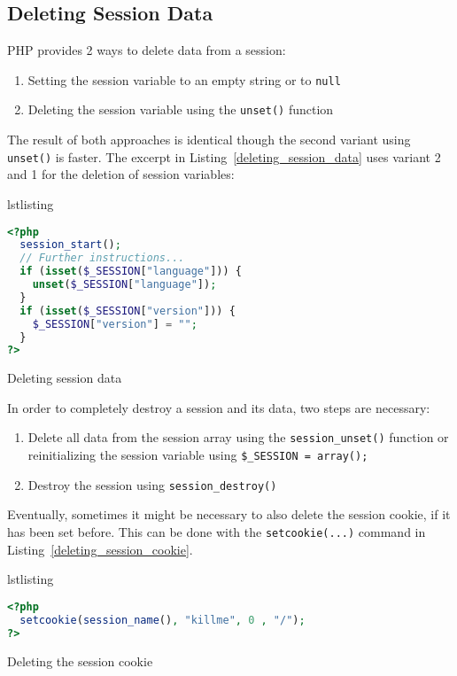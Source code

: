 \documentclass[a4paper, justified, notoc]{tufte-handout} %
\makeatletter
\newenvironment{listing}[1][htbp]
  {\ifvmode\else\unskip\fi\begin{@tufte@float}[#1]{lstlisting}{}}
  {\end{@tufte@float} } %
\makeatother
\begin{document}
\subsection{Deleting Session Data} %
\label{sub:deleting_session_data}
PHP provides 2 ways to delete data from a session:
\begin{enumerate}
	\item Setting the session variable to an empty string or to \texttt{null}
	\item Deleting the session variable using the \texttt{unset()} function
\end{enumerate}
The result of both approaches is identical though the second variant using \texttt{unset()} is faster. 
The excerpt in Listing~\ref{deleting_session_data} uses variant 2 and 1 for the deletion of session variables:
\begin{listing}
\begin{lstlisting}[language=PHP]
<?php
  session_start();
  // Further instructions...
  if (isset($_SESSION["language"])) {
    unset($_SESSION["language"]);
  }
  if (isset($_SESSION["version"])) {
    $_SESSION["version"] = "";
  }
?>
\end{lstlisting}
	\caption{Deleting session data}
	\label{deleting_session_data}
\end{listing}

In order to completely destroy a session and its data, two steps are necessary:
\begin{enumerate}
	\item Delete all data from the session array using the \texttt{session\_unset()} function or reinitializing the session variable using \texttt{\$\_SESSION = array();}
	\item Destroy the session using \texttt{session\_destroy()}
\end{enumerate}

Eventually, sometimes it might be necessary to also delete the session cookie, if it has been set before. 
This can be done with the \texttt{setcookie(...)} command in Listing~\ref{deleting_session_cookie}.
\begin{listing}
\begin{lstlisting}[language=PHP]
<?php
  setcookie(session_name(), "killme", 0 , "/");
?>
\end{lstlisting}
	\caption{Deleting the session cookie}
	\label{deleting_session_cookie}
\end{listing}
\end{document}
